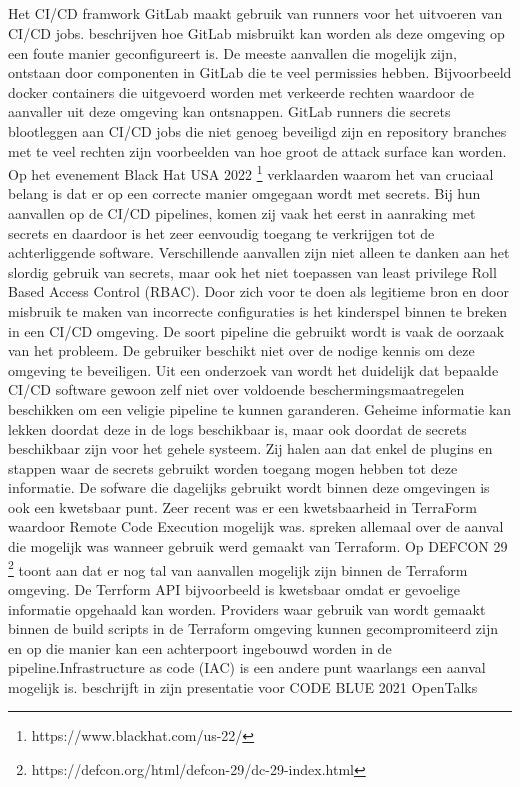 \subsection{}
\label{sec:Praktische voorbeelden uit de security wereld}
Het CI/CD framwork GitLab maakt gebruik van runners voor het uitvoeren van CI/CD jobs. \textcite{Haymore2022} beschrijven hoe GitLab misbruikt kan worden als deze omgeving op een foute manier geconfigureert is. De meeste aanvallen die mogelijk zijn, ontstaan door componenten in GitLab die te veel permissies hebben. Bijvoorbeeld docker containers die uitgevoerd worden met verkeerde rechten waardoor de aanvaller uit deze omgeving kan ontsnappen. GitLab runners die secrets blootleggen aan CI/CD jobs die niet genoeg beveiligd zijn en repository branches met te veel rechten zijn voorbeelden van hoe groot de attack surface kan worden. Op het evenement Black Hat USA 2022 \footnote{https://www.blackhat.com/us-22/} verklaarden \textcite{Smart2022} waarom het van cruciaal belang is dat er op een correcte manier omgegaan wordt met secrets. Bij hun aanvallen op de CI/CD pipelines, komen zij vaak het eerst in aanraking met secrets en daardoor is het zeer eenvoudig toegang te verkrijgen tot de achterliggende software. Verschillende aanvallen zijn niet alleen te danken aan het slordig gebruik van secrets, maar ook het niet toepassen van least privilege Roll Based Access Control (RBAC). Door zich voor te doen als legitieme bron en door misbruik te maken van incorrecte configuraties is het kinderspel binnen te breken in een CI/CD omgeving. De soort pipeline die gebruikt wordt is vaak de oorzaak van het probleem. De gebruiker beschikt niet over de nodige kennis om deze omgeving te beveiligen. Uit een onderzoek van \textcite{Koishybayev2022} wordt het duidelijk dat bepaalde CI/CD software gewoon zelf niet over voldoende beschermingsmaatregelen beschikken om een veligie pipeline te kunnen garanderen. Geheime informatie kan lekken doordat deze in de logs beschikbaar is, maar ook doordat de secrets beschikbaar zijn voor het gehele systeem. Zij halen aan dat enkel de plugins en stappen waar de secrets gebruikt worden toegang mogen hebben tot deze informatie. De sofware die dagelijks gebruikt wordt binnen deze omgevingen is ook een kwetsbaar punt. Zeer recent was er een kwetsbaarheid in TerraForm waardoor Remote Code Execution mogelijk was.\autocite{Suezawa2021}\autocite{Kaskasoli2021}\autocite{Frank2021} spreken allemaal over de aanval die mogelijk was wanneer gebruik werd gemaakt van Terraform. Op DEFCON 29 \footnote{https://defcon.org/html/defcon-29/dc-29-index.html} toont \textcite{Ahmed2021} aan dat er nog tal van aanvallen mogelijk zijn binnen de Terraform omgeving. De Terrform API bijvoorbeeld is kwetsbaar omdat er gevoelige informatie opgehaald kan worden. Providers waar gebruik van wordt gemaakt binnen de build scripts in de Terraform omgeving kunnen gecompromiteerd zijn en op die manier kan een achterpoort ingebouwd worden in de pipeline.Infrastructure as code (IAC) is een andere punt waarlangs een aanval mogelijk is. \textcite{Suezawa} beschrijft in zijn presentatie voor CODE BLUE 2021 OpenTalks 